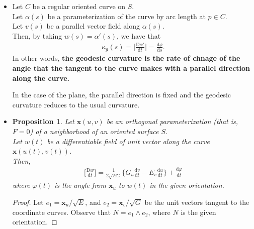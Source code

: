 \documentclass[10pt]{article}
\newtheorem{proposition}[lemma]{Proposition}
\newcommand{\dee}{\mathrm{d}}
\newcommand{\Dee}{\mathrm{D}}
\newcommand{\ve}[1]{\mathbf{#1}}
\begin{document}
\begin{itemize}
    \item Let $C$ be a regular oriented curve on $S$.\\
    Let $\alpha(s)$ be a parameterization of the curve by arc length at $p \in C$.\\
    Let $v(s)$ be a parallel vector field along $\alpha(s)$.\\
    Then, by taking $w(s) = \alpha'(s)$, we have that
    \begin{align*}
      \kappa_g(s) = \bigg[ \frac{\Dee \alpha'}{\dee t} \bigg] = \frac{\dee \phi}{\dee s}.
    \end{align*}
    In other words, {\bf the geodesic curvature is the rate of chnage of the angle that the tangent to the curve makes with a parallel direction along the curve.}

    In the case of the plane, the parallel direction is fixed and the geodesic curvature reduces to the usual curvature.

    \item \begin{proposition} \label{geodesic-curvature-formula}
      Let $\ve{x}(u,v)$ be an orthogonal parameterization (that is, $F = 0$) of a neighborhood of an oriented surface $S$.\\
      Let $w(t)$ be a differentiable field of unit vector along the curve $\ve{x}(u(t), v(t))$.\\
      Then,
      \begin{align*}
        \bigg[ \frac{\Dee w}{\dee t} \bigg] = \frac{1}{2\sqrt{EG}} \bigg\{ G_u \frac{\dee v}{\dee t} - E_v \frac{\dee u}{\dee t} \bigg\} + \frac{\dee \varphi}{\dee t}
      \end{align*}
      where $\varphi(t)$ is the angle from $\ve{x}_u$ to $w(t)$ in the given orientation.
    \end{proposition}
    \begin{proof}
      Let $e_1 = \ve{x}_u / \sqrt{E}$, and $e_2 = \ve{x}_v / \sqrt{G}$ be the unit vectors tangent to the coordinate curves. Observe that $N = e_1 \wedge e_2$, where $N$ is the given orientation.


\end{proof}
\end{itemize}
\end{document}
